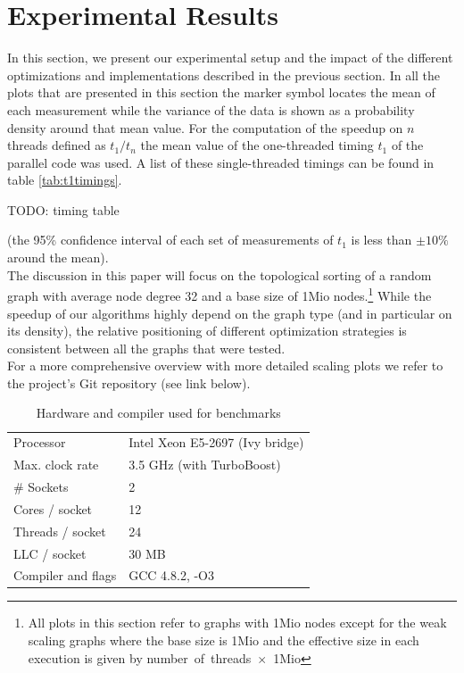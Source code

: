 \section{Experimental Results}\label{sec:exp}
%
In this section, we present our experimental setup and the impact of the different optimizations and implementations described in the previous section.
%
In all the plots that are presented in this section the marker symbol locates the mean of each measurement while the variance of the data is shown as a probability density around that mean value.
For the computation of the speedup on $n$ threads defined as $t_1/t_n$ the mean value of the one-threaded timing $t_1$ of the parallel code was used.
A list of these single-threaded timings can be found in table \ref{tab:t1timings}. 
\par\medskip
{\Large TODO: timing table}
\par\medskip
(the 95\% confidence interval of each set of measurements of $t_1$ is less than $\pm 10\%$ around the mean). \\
The discussion in this paper will focus on the topological sorting of a random graph with average node degree 32 and a base size of 1Mio nodes.\footnote{All plots in this section refer to graphs with 1Mio nodes except for the weak scaling graphs where the base size is 1Mio and the effective size in each execution is given by number~of~threads~$\times$~1Mio} 
While the speedup of our algorithms highly depend on the graph type (and in particular on its density), the relative positioning of different optimization strategies is consistent between all the graphs that were tested. \\
For a more comprehensive overview with more detailed scaling plots we refer to the project's Git repository (see link below).

  \begin{table}[h]
    \centering
    \begin{tabular}{ll}
    \toprule
    Processor        & Intel Xeon E5-2697 (Ivy bridge) \\
    Max. clock rate  & 3.5 GHz (with TurboBoost)\\
    \# Sockets       & 2 \\
    Cores / socket   & 12 \\
    Threads / socket & 24 \\
    LLC / socket     & 30 MB \\
    \midrule
    Compiler and flags & GCC 4.8.2, -O3\\
    \bottomrule
    \end{tabular}
    \caption{Hardware and compiler used for benchmarks}
    \label{tab:hardware}
  \end{table}
 
